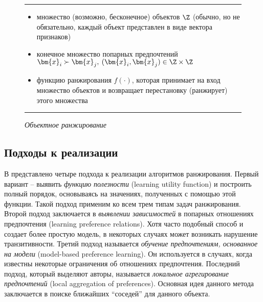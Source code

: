 	\begin{figure}[h!]
		\hrule
		\begin{description}[nosep]
			\item[Дано:] \null\leavevmode
			\begin{itemize}[itemsep=0pt,leftmargin=2ex,label=\textbf{---}]
				\item множество (возможно, бесконечное) объектов $\Z$ (обычно, но не обязательно, каждый объект представлен в виде вектора признаков)
				\item конечное множество попарных предпочтений $\bm{x}_i \succ \bm{x}_j, \: (\bm{x}_i, \bm{x}_j) \in \Z \times \Z$
			\end{itemize}
			\item[Найти:] \null\leavevmode
			\begin{itemize}[itemsep=0pt,leftmargin=2ex,label=\textbf{---}]
				\item функцию ранжирования $f(\cdot)$, которая принимает на вход множество объектов и возвращает перестановку (ранжирует) этого множества
			\end{itemize}
		\end{description} 
		\hrule
		\caption*{\textit{Объектное ранжирование}\cite[с.~7]{plbook:Introduction:2010}}
		\label{fig:object_ranking}
	\end{figure}
	
	\subsection{Подходы к реализации}
	В \cite{plbook:Introduction:2010} представлено четыре подхода к реализации алгоритмов ранжирования. 
	Первый вариант – выявить \emph{функцию полезности} (learning utility function) и построить полный порядок, основываясь на значениях, полученных с помощью этой функции. Такой подход применим ко всем трем типам задач ранжирования. 
	Второй подход заключается в \emph{выявлении зависимостей} в попарных отношениях предпочтения (learning preference relations). Хотя часто подобный способ и создает более простую модель, в некоторых случаях может возникать нарушение транзитивности\cite[с.~10]{plbook:Introduction:2010}. 
	Третий подход называется \emph{обучение предпочтениям, основанное на модели} (model-based preference learning). Он используется в случаях, когда известны некоторые ограничения об отношениях предпочтения. 
	Последний подход, который выделяют авторы, называется \emph{локальное агрегирование предпочтений} (local aggregation of preferences). Основная идея данного метода заключается в поиске ближайших \enquote{соседей} для данного объекта.
	
